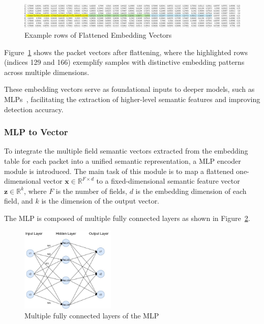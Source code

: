 \begin{ZhChapter}
    \begin{figure}[htbp]
        \centering
        \includegraphics[width = 1\textwidth]{image/merge.jpg}
        \caption{Example rows of Flattened Embedding Vectors}
        \label{fig:merge}
    \end{figure}


    Figure~\ref{fig:merge} shows the packet vectors after flattening, where the highlighted rows (indices 129 and 166) exemplify samples with distinctive embedding patterns across multiple dimensions.





    These embedding vectors serve as foundational inputs to deeper models, such as MLPs~\cite{taud2017multilayer}, facilitating the extraction of higher-level semantic features and improving detection accuracy.

    \subsubsection{MLP to Vector}
    To integrate the multiple field semantic vectors extracted from the embedding table for each packet into a unified semantic representation, a MLP encoder module is introduced. The main task of this module is to map a flattened one-dimensional vector \(\mathbf{x} \in \mathbb{R}^{F \times d}\) to a fixed-dimensional semantic feature vector \(\mathbf{z} \in \mathbb{R}^k\), where \(F\) is the number of fields, \(d\) is the embedding dimension of each field, and \(k\) is the dimension of the output vector.



    The MLP is composed of multiple fully connected layers as shown in Figure~\ref{fig:mlp}.
    \begin{figure}[htbp]
        \centering
        \includegraphics[width = 0.4\textwidth]{image/MLP.jpg}
        \caption{Multiple fully connected layers of the MLP}
        \label{fig:mlp}
    \end{figure}



\end{ZhChapter}
